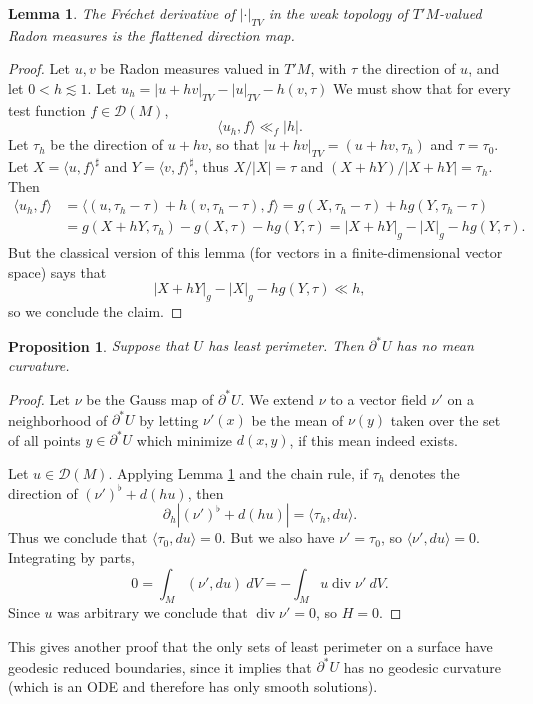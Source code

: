 \documentclass[reqno,12pt,letterpaper]{amsart}
\DeclareMathOperator{\Div}{div}
\newtheorem{lemma}[theorem]{Lemma}
\newtheorem{proposition}[theorem]{Proposition}
\theoremstyle{definition}
\numberwithin{equation}{section}
\begin{document}
\begin{lemma}\label{derivative of TV}
The Fr\'echet derivative of $|\cdot|_{TV}$ in the weak topology of $T'M$-valued Radon measures is the flattened direction map.
\end{lemma}
\begin{proof}
Let $u, v$ be Radon measures valued in $T'M$, with $\tau$ the direction of $u$, and let $0 < h \lesssim 1$.
Let $u_h = |u + hv|_{TV} - |u|_{TV} - h(v, \tau)$
We must show that for every test function $f \in \mathcal D(M)$,
$$\langle u_h, f\rangle \ll_f |h|.$$
Let $\tau_h$ be the direction of $u + hv$, so that $|u + hv|_{TV} = (u + hv, \tau_h)$ and $\tau = \tau_0$.
Let $X = \langle u, f\rangle^\sharp$ and $Y = \langle v, f\rangle^\sharp$, thus $X/|X| = \tau$ and $(X + hY)/|X + hY| = \tau_h$.
Then
\begin{align*}
\langle u_h, f\rangle &= \langle (u, \tau_h - \tau) + h(v, \tau_h - \tau), f\rangle = g(X, \tau_h - \tau) + hg(Y, \tau_h - \tau)\\
&= g(X + hY, \tau_h) - g(X, \tau) - hg(Y, \tau) = |X + hY|_g - |X|_g - hg(Y, \tau).
\end{align*}
But the classical version of this lemma (for vectors in a finite-dimensional vector space) says that
$$|X + hY|_g - |X|_g - hg(Y, \tau) \ll h,$$
so we conclude the claim.
\end{proof}

\begin{proposition}
Suppose that $U$ has least perimeter.
Then $\partial^*U$ has no mean curvature.
\end{proposition}
\begin{proof}
Let $\nu$ be the Gauss map of $\partial^*U$.
We extend $\nu$ to a vector field $\nu'$ on a neighborhood of $\partial^* U$ by letting $\nu'(x)$ be the mean of $\nu(y)$ taken over the set of all points $y \in \partial^* U$ which minimize $d(x, y)$, if this mean indeed exists.

Let $u \in \mathcal D(M)$.
Applying Lemma \ref{derivative of TV} and the chain rule, if $\tau_h$ denotes the direction of $(\nu')^\flat + d(hu)$, then
$$\partial_h |(\nu')^\flat + d(hu)| = \langle \tau_h, du\rangle.$$
Thus we conclude that $\langle \tau_0, du\rangle = 0$.
But we also have $\nu' = \tau_0$, so $\langle \nu', du\rangle = 0$.
Integrating by parts,
$$0 = \int_M (\nu', du) ~dV = -\int_M u \Div \nu' ~dV.$$
Since $u$ was arbitrary we conclude that $\Div \nu' = 0$, so $H = 0$.
\end{proof}

This gives another proof that the only sets of least perimeter on a surface have geodesic reduced boundaries, since it implies that $\partial^* U$ has no geodesic curvature (which is an ODE and therefore has only smooth solutions).
\end{document}
